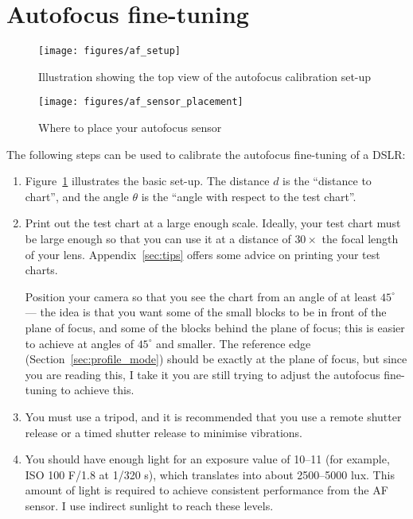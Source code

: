 \documentclass[a4paper]{article}
\begin{document}
\section{Autofocus fine-tuning}
\label{sec:autofocus}
%
\begin{figure}[bp!]
\centering
\texttt{[image: figures/af\_setup]}
\caption{Illustration showing the top view of the autofocus calibration
set-up}
\label{fig:af_setup}
\end{figure}
%
\begin{figure}[bp!]
\centering
\texttt{[image: figures/af\_sensor\_placement]}
\caption{Where to place your autofocus sensor}
\label{fig:af_sensor_placement}
\end{figure}
%
The following steps can be used to calibrate the autofocus fine-tuning of a
DSLR:
\begin{enumerate}
    \item Figure~\ref{fig:af_setup} illustrates the basic set-up. The
distance $d$ is the ``distance to chart'', and the angle $\theta$ is the
``angle with respect to the test chart''.
    \item Print out the test chart at a large enough scale. Ideally, your
test chart must be large enough so that you can use it at a distance of
$30\times$ the focal length of your lens. Appendix~\ref{sec:tips} offers
some advice on printing your test charts.

Position your camera so that you see the chart from an angle of at least $45^\circ$ --- the idea is that you
want some of the small blocks to be in front of the plane of focus, and some
of the blocks behind the plane of focus; this is easier to achieve at angles
of $45^\circ$ and smaller. The reference edge (Section~\ref{sec:profile_mode}) should be
exactly at the plane of focus, but since you are reading this, I take it you
are still trying to adjust the autofocus fine-tuning to achieve this.

  \item You must use a tripod, and it is recommended that you use a remote
shutter release or a timed shutter release to minimise vibrations.

   \item You should have enough
light for an exposure value of 10--11 (for example, ISO 100 F/1.8 at 1/320
s), which translates into about 2500--5000 lux. This amount of light is 
required to achieve consistent performance from
the AF sensor. I use indirect sunlight to reach these levels.


\end{enumerate}
\end{document}
